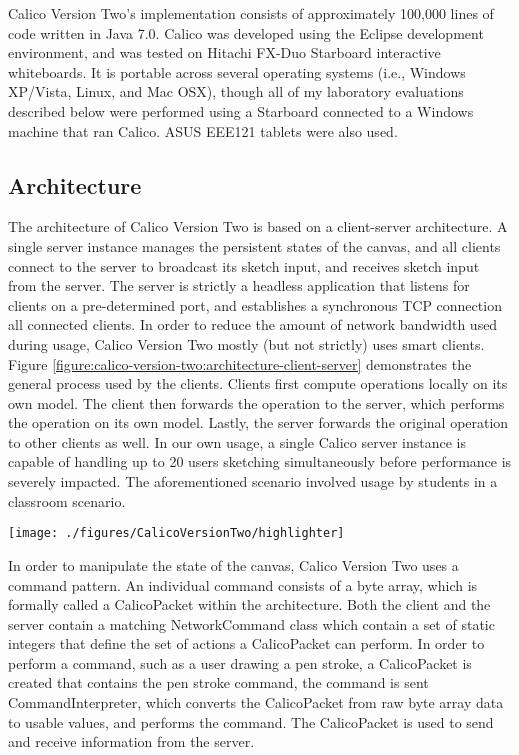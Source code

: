 \documentclass[12pt,fleqn]{ucithesis}
\begin{document}
Calico Version Two's implementation consists of approximately 100,000 lines of code written in Java 7.0. Calico was developed using the Eclipse development environment, and was tested on Hitachi FX-Duo Starboard interactive whiteboards. It is portable across several operating systems (i.e., Windows XP/Vista, Linux, and Mac OSX), though all of my laboratory evaluations described below were performed using a Starboard connected to a Windows machine that ran Calico. ASUS EEE121 tablets were also used.

\subsection{Architecture}

The architecture of Calico Version Two is based on a client-server architecture. A single server instance manages the persistent states of the canvas, and all clients connect to the server to broadcast its sketch input, and receives sketch input from the server. The server is strictly a headless application that listens for clients on a pre-determined port, and establishes a synchronous TCP connection all connected clients. In order to reduce the amount of network bandwidth used during usage, Calico Version Two mostly (but not strictly) uses smart clients.  Figure \ref{figure:calico-version-two:architecture-client-server} demonstrates the general process used by the clients. Clients first compute operations locally on its own model. The client then forwards the operation to the server, which performs the operation on its own model. Lastly, the server forwards the original operation to other clients as well. In our own usage, a single Calico server instance is capable of handling up to 20 users sketching simultaneously before performance is severely impacted. The aforementioned scenario involved usage by students in a classroom scenario.

\begin{figure*}[tbh]
  \centering
  \texttt{[image: ./figures/CalicoVersionTwo/highlighter]}
  \caption{Highlighter}
  \label{figure:calico-version-two:architecture-client-server}
\end{figure*}

In order to manipulate the state of the canvas, Calico Version Two uses a command pattern. An individual command consists of a byte array, which is formally called a CalicoPacket within the architecture. Both the client and the server contain a matching NetworkCommand class which contain a set of static integers that define the set of actions a CalicoPacket can perform. In order to perform a command, such as a user drawing a pen stroke, a CalicoPacket is created that contains the pen stroke command, the command is sent CommandInterpreter, which converts the CalicoPacket from raw byte array data to usable values, and performs the command. The CalicoPacket is used to send and receive information from the server.
\end{document}
